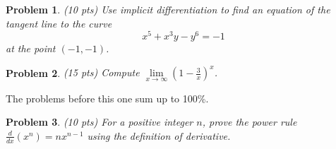 \documentclass{article}
\newtheorem{problem}{Problem}
\begin{document}
\begin{problem}(10 pts)
Use implicit differentiation to find an equation of the tangent line to the curve
\[
x^{5}+x^{3}y -y^6=-1
\]
at the point $(-1, -1)$.
\end{problem}
\newpage
\begin{problem}(15 pts)
Compute $\lim\limits_{x\to \infty} \left( 1- \frac{3}{x} \right)^x$.
\end{problem}
\vskip 9cm
The problems before this one sum up to 100\%.
\begin{problem}(10 pts)
For a positive integer $n$, prove the power rule $\frac{d}{dx}(x^n)=n x^{n-1} $ using the definition of derivative.
\end{problem}
\end{document}
